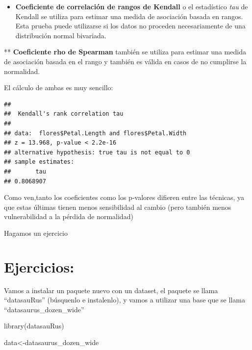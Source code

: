 \documentclass[
]{book}
\newenvironment{Shaded}{\begin{snugshade}}{\end{snugshade}}
\newcommand{\AttributeTok}[1]{\textcolor[rgb]{0.77,0.63,0.00}{#1}}
\newcommand{\FunctionTok}[1]{\textcolor[rgb]{0.00,0.00,0.00}{#1}}
\newcommand{\NormalTok}[1]{#1}
\newcommand{\OtherTok}[1]{\textcolor[rgb]{0.56,0.35,0.01}{#1}}
\newcommand{\SpecialCharTok}[1]{\textcolor[rgb]{0.00,0.00,0.00}{#1}}
\newcommand{\StringTok}[1]{\textcolor[rgb]{0.31,0.60,0.02}{#1}}
\providecommand{\tightlist}{%
  \setlength{\itemsep}{0pt}\setlength{\parskip}{0pt}}
\begin{document}
\begin{itemize}
\tightlist
\item
  \textbf{Coeficiente de correlación de rangos de Kendall} o el estadístico \emph{tau} de Kendall se utiliza para estimar una medida de asociación basada en rangos. Esta prueba puede utilizarse si los datos no proceden necesariamente de una distribución normal bivariada.
\end{itemize}

** \textbf{Coeficiente rho de Spearman} también se utiliza para estimar una medida de asociación basada en el rango y también es válida en casos de no cumplirse la normalidad.

El cálculo de ambas es muy sencillo:

\begin{Shaded}
\end{Shaded}

\begin{verbatim}
## 
##  Kendall's rank correlation tau
## 
## data:  flores$Petal.Length and flores$Petal.Width
## z = 13.968, p-value < 2.2e-16
## alternative hypothesis: true tau is not equal to 0
## sample estimates:
##       tau 
## 0.8068907
\end{verbatim}

Como ven,tanto los coeficientes como los p-valores difieren entre las técnicas, ya que estas últimas tienen menos sensibilidad al cambio (pero también menos vulnerabilidad a la pérdida de normalidad)

Hagamos un ejercicio

\hypertarget{ejercicios-8}{%
\section{\texorpdfstring{ Ejercicios:}{ Ejercicios:}}\label{ejercicios-8}}

Vamos a instalar un paquete nuevo con un dataset, el paquete se llama ``datasauRus'' (búsquenlo e instalenlo), y vamos a utilizar una base que se llama ``datasaurus\_dozen\_wide''

\begin{Shaded}
\begin{Highlighting}[]
\FunctionTok{library}\NormalTok{(datasauRus)}

\NormalTok{data}\OtherTok{\textless{}{-}}\NormalTok{datasaurus\_dozen\_wide}
\end{Highlighting}
\end{Shaded}
\end{document}
